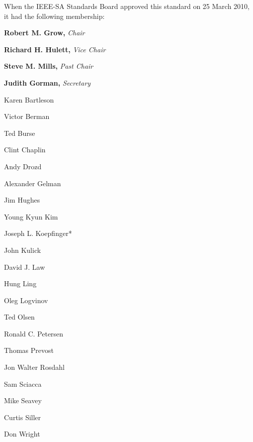 \thispagestyle{hlafrontroman}
\begingroup
\setlength{\parindent}{0pt}
\setlength{\parskip}{0pt}
\frontBody
\vspace*{-12.9pt}

When the IEEE-SA Standards Board approved this standard on 25 March 2010, it had the following\linebreak
membership:\par

\vspace{0pt}
{\centering\frontOfficer
\textbf{Robert M. Grow,} \textit{Chair}\par
\textbf{Richard H. Hulett,} \textit{Vice Chair}\par
\textbf{Steve M. Mills,} \textit{Past Chair}\par
\textbf{Judith Gorman,} \textit{Secretary}\par}

\vspace{5.13pt}
\noindent\hspace*{26.5pt}%
\begin{minipage}[t]{110pt}
    \frontBoardNamesA
    Karen Bartleson\par
    Victor Berman\par
    Ted Burse\par
    Clint Chaplin\par
    Andy Drozd\par
    Alexander Gelman\par
    Jim Hughes
\end{minipage}%
\hspace*{46.9pt}%
\begin{minipage}[t]{100pt}
    \frontBoardNamesB
    Young Kyun Kim\par
    Joseph L. Koepfinger*\par
    John Kulick\par
    David J. Law\par
    Hung Ling\par
    Oleg Logvinov\par
    Ted Olsen
\end{minipage}%
\hspace*{51.2pt}%
\begin{minipage}[t]{95pt}
    \frontBoardNamesC
    Ronald C. Petersen\par
    Thomas Prevost\par
    Jon Walter Rosdahl\par
    Sam Sciacca\par
    Mike Seavey\par
    Curtis Siller\par
    Don Wright
\end{minipage}\par

